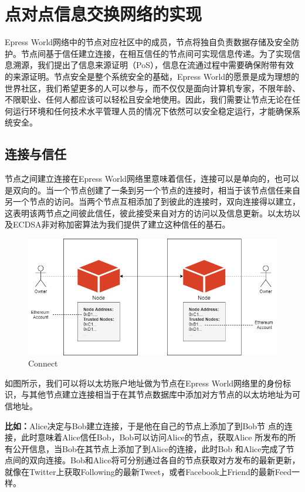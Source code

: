 \documentclass[12pt,a4paper]{extarticle}
\begin{document}
\section{点对点信息交换网络的实现}
    Epress World网络中的节点对应社区中的成员，节点将独自负责数据存储及安全防护。节点间基于信任建立连接，在相互信任的节点间可实现信息传递。为了实现信息溯源，我们提出了信息来源证明（PoS），信息在流通过程中需要确保附带有效的来源证明。节点安全是整个系统安全的基础，Epress World的愿景是成为理想的世界社区，我们希望更多的人可以参与，而不仅仅是面向计算机专家，不限年龄、不限职业、任何人都应该可以轻松且安全地使用。因此，我们需要让节点无论在任何运行环境和任何技术水平管理人员的情况下依然可以安全稳定运行，才能确保系统安全。
\subsection{连接与信任}
    节点之间建立连接在Epress World网络里意味着信任，连接可以是单向的，也可以是双向的。当一个节点创建了一条到另一个节点的连接时，相当于该节点信任来自另一个节点的访问。当两个节点互相添加了到彼此的连接时，双向连接得以建立，这表明该两节点之间彼此信任，彼此接受来自对方的访问以及信息更新。以太坊以及ECDSA非对称加密算法为我们提供了建立这种信任的基石。

    \begin{figure}[H]
        \centering
        \includegraphics[width=\textwidth]{figures-connect.png}
        \caption{Connect}
    \end{figure}

    如图所示，我们可以将以太坊账户地址做为节点在Epress World网络里的身份标识，与其他节点建立连接相当于在其节点数据库中添加对方节点的以太坊地址为可信地址。
    ~\newline
    \begin{blockqt}
    \textbf{比如：}Alice决定与Bob建立连接，于是他在自己的节点上添加了到Bob节
    点的连接，此时意味着Alice信任Bob，Bob可以访问Alice的节点，获取Alice
    所发布的所有公开信息，当Bob在其节点上添加了到Alice的连接，此时Bob
    和Alice完成了节点间的双向连接。Bob和Alice将可分别通过各自的节点获取对方发布的最新更新，就像在Twitter上获取Following的最新Tweet，或者Facebook上Friend的最新Feed一样。
    \end{blockqt}
\end{document}
